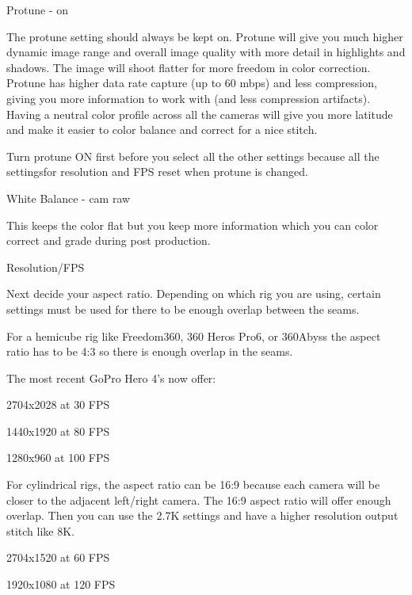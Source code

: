 \begin{fullwidth}
{\large Protune - on \par}


The protune setting should always be kept on. Protune will give you much higher dynamic image range and overall image quality with more detail in highlights and shadows. The image will shoot flatter for more freedom in color correction. Protune has higher data rate capture (up to 60 mbps) and less compression, giving you more information to work with (and less compression artifacts). Having a neutral color profile across all the cameras will give you more latitude and make it easier to color balance and correct for a nice stitch. 

\tip Turn protune ON first before you select all the other settings because all the settingsfor resolution and FPS reset when protune is changed.

\clearpage
{\large White Balance - cam raw \par} 


This keeps the color flat but you keep more information which you can color correct and grade during post production.

{\large Resolution/FPS \par}

Next decide your aspect ratio. Depending on which rig you are using, certain settings must be used for there to be enough overlap between the seams. 

For a hemicube rig like Freedom360, 360 Heros Pro6, or 360Abyss the aspect ratio has to be 4:3 so there is enough overlap in the seams. 

The most recent GoPro Hero 4's now offer:

2704x2028 at 30 FPS

1440x1920 at 80 FPS 

\clearpage
1280x960 at 100 FPS


For cylindrical rigs, the aspect ratio can be 16:9 because each camera will be closer to the adjacent left/right camera. The 16:9 aspect ratio will offer enough overlap. Then you can use the 2.7K settings and have a higher resolution output stitch like 8K. 

2704x1520 at 60 FPS


\clearpage
1920x1080 at 120 FPS


\end{fullwidth}
